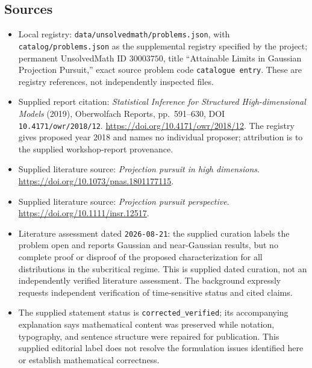 \documentclass[11pt]{article}
\begin{document}
\subsection{Sources}
\begin{itemize}
\item Local registry: \texttt{data/unsolvedmath/problems.json}, with \texttt{catalog/problems.json} as the supplemental registry specified by the project; permanent UnsolvedMath ID \(30003750\), title ``Attainable Limits in Gaussian Projection Pursuit,'' exact source problem code \texttt{catalogue entry}. These are registry references, not independently inspected files.
\item Supplied report citation: \emph{Statistical Inference for Structured High-dimensional Models} (2019), Oberwolfach Reports, pp.~591--630, DOI \texttt{10.4171/owr/2018/12}. \url{https://doi.org/10.4171/owr/2018/12}. The registry gives proposed year 2018 and names no individual proposer; attribution is to the supplied workshop-report provenance.
\item Supplied literature source: \emph{Projection pursuit in high dimensions}. \url{https://doi.org/10.1073/pnas.1801177115}.
\item Supplied literature source: \emph{Projection pursuit perspective}. \url{https://doi.org/10.1111/insr.12517}.
\item Literature assessment dated \texttt{2026-08-21}: the supplied curation labels the problem open and reports Gaussian and near-Gaussian results, but no complete proof or disproof of the proposed characterization for all distributions in the subcritical regime. This is supplied dated curation, not an independently verified literature assessment. The background expressly requests independent verification of time-sensitive status and cited claims.
\item The supplied statement status is \texttt{corrected\_verified}; its accompanying explanation says mathematical content was preserved while notation, typography, and sentence structure were repaired for publication. This supplied editorial label does not resolve the formulation issues identified here or establish mathematical correctness.
\end{itemize}
\end{document}
